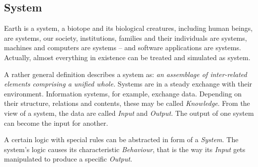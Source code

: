 %
%
%
%
%
%
%

\subsection{System}
\label{system_heading}

Earth is a system, a biotope and its biological creatures, including human
beings, are systems, our society, institutions, families and their individuals
are systems, machines and computers are systems -- and software applications
are systems. Actually, almost everything in existence can be treated and
simulated as system.

A rather general definition \cite{wikipedia} describes a system as: \textit{an
assemblage of inter-related elements comprising a unified whole.} Systems are
in a steady exchange with their environment. Information systems, for example,
exchange data. Depending on their structure, relations and contents, these may
be called \emph{Knowledge}. From the view of a system, the data are called
\emph{Input} and \emph{Output}. The output of one system can become the input
for another.

A certain logic with special rules can be abstracted in form of a \emph{System}.
The system's logic causes its characteristic \emph{Behaviour}, that is the way
its \emph{Input} gets manipulated to produce a specific \emph{Output}.




%

